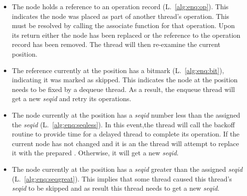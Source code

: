 \begin{itemize}
\item The node holds a reference to an operation record (L.~\ref{alg:enq:op}).
This indicates the node was placed as part of another thread's operation.
This must be resolved by calling the associate function for that operation.
Upon its return either the node has been replaced or the reference to the operation record has been removed.
The thread will then re-examine the current position.

\item The reference currently at the position has a bitmark (L.~\ref{alg:enq:bit}), indicating it was marked as skipped.
This indicates the node at the position needs to be fixed by a dequeue thread.
As a result, the enqueue thread will get a new \emph{seqid} and retry its operations.

\item The node currently at the position has a \emph{seqid} number less than the assigned the \emph{seqid} (L.~\ref{alg:enq:seqless}).
In this event,the thread will call the backoff routine to provide time for a delayed thread to complete its operation.
If the current node has not changed and it is an  the thread will attempt to replace it with the prepared .
Otherwise, it will get a new \emph{seqid}.

\item The node currently at the position has a \emph{seqid} greater than the assigned \emph{seqid} (L.~\ref{alg:enq:seqgreat}).
This implies that some thread caused this thread's \emph{seqid} to be skipped and as result this thread needs to get a new \emph{seqid}.

\end{itemize}


